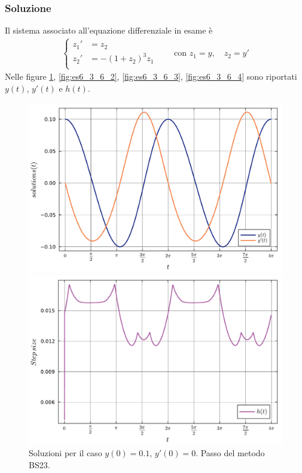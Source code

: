 \documentclass[letterpaper, 12pt]{article}
\numberwithin{equation}{section}    %
\begin{document}
\subsubsection{Soluzione}
Il sistema associato all'equazione differenziale in esame è 
\begin{align*}
\left\{
\begin{array}{rl}
    z_1' &= z_2 \\
    z_2' &= - (1+z_2)^3 z_1 \\
\end{array}
\right.
\qquad \text{con } z_1 = y, \quad z_2 = y'
\end{align*}
Nelle figure \ref{fig:es6_3_6_1}, \ref{fig:es6_3_6_2}, \ref{fig:es6_3_6_3}, \ref{fig:es6_3_6_4} 
sono riportati $y(t)$, $y'(t)$ e $h(t)$.
\begin{figure}[!ht]
    \centering
    \begin{minipage}[b]{0.40\textwidth}
        \includegraphics[width=\textwidth]{6361.pdf}
    \end{minipage}
    \hspace{0.5cm}
    \begin{minipage}[b]{0.40\textwidth}
        \includegraphics[width=\textwidth]{6362.pdf}
    \end{minipage}
    \caption{Soluzioni per il caso $y(0) = 0.1$, $y'(0) = 0$. Passo del metodo BS23.}
    \label{fig:es6_3_6_1}
\end{figure}
\end{document}
